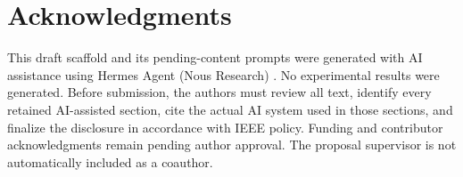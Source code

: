 \section*{Acknowledgments}
This draft scaffold and its pending-content prompts were generated with AI assistance using Hermes Agent (Nous Research) \cite{ai-system}. No experimental results were generated. Before submission, the authors must review all text, identify every retained AI-assisted section, cite the actual AI system used in those sections, and finalize the disclosure in accordance with IEEE policy. Funding and contributor acknowledgments remain pending author approval. The proposal supervisor is not automatically included as a coauthor.
